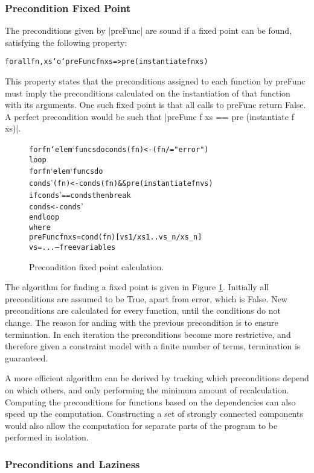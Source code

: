 \documentclass[preprint]{sigplanconf}
\newcommand{\C}[1]{\textsf{#1}}
\newenvironment{code}{\begin{alltt}\small}{\end{alltt}}
\begin{document}
\subsubsection{Precondition Fixed Point}

The preconditions given by |preFunc| are sound if a fixed point can be found, satisfying the following property:

\begin{code}
forall fn, xs `o` preFunc fn xs => pre (instantiate fn xs)
\end{code}

This property states that the preconditions assigned to each function by \C{preFunc} must imply the preconditions calculated on the instantiation of that function with its arguments. One such fixed point is that all calls to \C{preFunc} return False. A perfect precondition would be such that |preFunc f xs == pre (instantiate f xs)|.

\begin{figure}
\begin{code}
for fn `elem` funcs do conds(fn) <- (fn /= "error")
loop
    for fn `elem` funcs do
        conds'(fn) <- conds(fn) && pre (instantiate fn vs)
    if conds' == conds then break
    conds <- conds'
end loop
    where
        preFunc fn xs = cond(fn)[vs1/xs1 .. vs_n/xs_n]
        vs = ... -- free variables
\end{code}
\caption{Precondition fixed point calculation.}
\label{fig:precond_fixp}
\end{figure}

The algorithm for finding a fixed point is given in Figure \ref{fig:precond_fixp}. Initially all preconditions are assumed to be True, apart from \C{error}, which is False. New preconditions are calculated for every function, until the conditions do not change. The reason for anding with the previous precondition is to ensure termination. In each iteration the preconditions become more restrictive, and therefore given a constraint model with a finite number of terms, termination is guaranteed.

A more efficient algorithm can be derived by tracking which preconditions depend on which others, and only performing the minimum amount of recalculation. Computing the preconditions for functions based on the dependencies can also speed up the computation. Constructing a set of strongly connected components would also allow the computation for separate parts of the program to be performed in isolation.

\subsubsection{Preconditions and Laziness}
\end{document}
